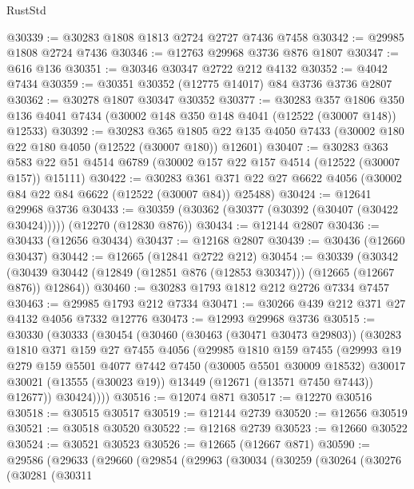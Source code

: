 \begin{lexlean}{RustStd}
\begin{coremodule}
@30339 := @30283 @1808 @1813 @2724 @2727 @7436 @7458
@30342 := @29985 @1808 @2724 @7436
@30346 := @12763 @29968 @3736 @876 @1807
@30347 := @616 @136
@30351 := @30346 @30347 @2722 @212 @4132
@30352 := @4042 @7434
@30359 := @30351 @30352 (@12775 @14017) @84 @3736 @3736 @2807
@30362 := @30278 @1807 @30347 @30352
@30377 := @30283
    @357
    @1806
    @350
    @136
    @4041
    @7434
    (@30002 @148 @350 @148 @4041 (@12522 (@30007 @148)) @12533)
@30392 := @30283
    @365
    @1805
    @22
    @135
    @4050
    @7433
    (@30002 @180 @22 @180 @4050 (@12522 (@30007 @180)) @12601)
@30407 := @30283
    @363
    @583
    @22
    @51
    @4514
    @6789
    (@30002 @157 @22 @157 @4514 (@12522 (@30007 @157)) @15111)
@30422 := @30283
    @361
    @371
    @22
    @27
    @6622
    @4056
    (@30002 @84 @22 @84 @6622 (@12522 (@30007 @84)) @25488)
@30424 := @12641 @29968 @3736
@30433 := @30359 (@30362 (@30377 (@30392 (@30407 (@30422 @30424))))) (@12270 (@12830 @876))
@30434 := @12144 @2807
@30436 := @30433 (@12656 @30434)
@30437 := @12168 @2807
@30439 := @30436 (@12660 @30437)
@30442 := @12665 (@12841 @2722 @212)
@30454 := @30339
    (@30342 (@30439 @30442 (@12849 (@12851 @876 (@12853 @30347))) (@12665 (@12667 @876)) @12864))
@30460 := @30283 @1793 @1812 @212 @2726 @7334 @7457
@30463 := @29985 @1793 @212 @7334
@30471 := @30266 @439 @212 @371 @27 @4132 @4056 @7332 @12776
@30473 := @12993 @29968 @3736
@30515 := @30330
    (@30333
      (@30454
        (@30460
          (@30463 (@30471 @30473 @29803))
          (@30283
            @1810
            @371
            @159
            @27
            @7455
            @4056
            (@29985
              @1810
              @159
              @7455
              (@29993
                @19
                @279
                @159
                @5501
                @4077
                @7442
                @7450
                (@30005 @5501 @30009 @18532)
                @30017
                @30021
                (@13555 (@30023 @19))
                @13449
                (@12671 (@13571 @7450 @7443))
                @12677))
            @30424))))
@30516 := @12074 @871
@30517 := @12270 @30516
@30518 := @30515 @30517
@30519 := @12144 @2739
@30520 := @12656 @30519
@30521 := @30518 @30520
@30522 := @12168 @2739
@30523 := @12660 @30522
@30524 := @30521 @30523
@30526 := @12665 (@12667 @871)
@30590 := @29586
    (@29633
      (@29660
        (@29854
          (@29963
            (@30034
              (@30259
                (@30264
                  (@30276
                    (@30281
                      (@30311

\end{coremodule}
\end{lexlean}
